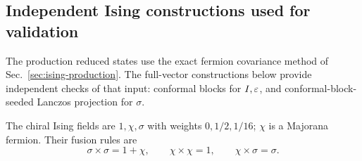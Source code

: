 \subsection{Independent Ising constructions used for validation}
\label{sec:ising-independent}
The production reduced states use the exact fermion covariance method
of Sec.~\ref{sec:ising-production}. The full-vector constructions below
provide independent checks of that input: conformal blocks for $I,\varepsilon$,
and conformal-block-seeded Lanczos projection for $\sigma$.

The chiral Ising fields are $1,\chi,\sigma$ with weights $0,1/2,1/16$;
$\chi$ is a Majorana fermion. Their fusion rules are
\begin{equation}
 \sigma\times\sigma=1+\chi,\qquad
 \chi\times\chi=1,\qquad \chi\times\sigma=\sigma.
\end{equation}

